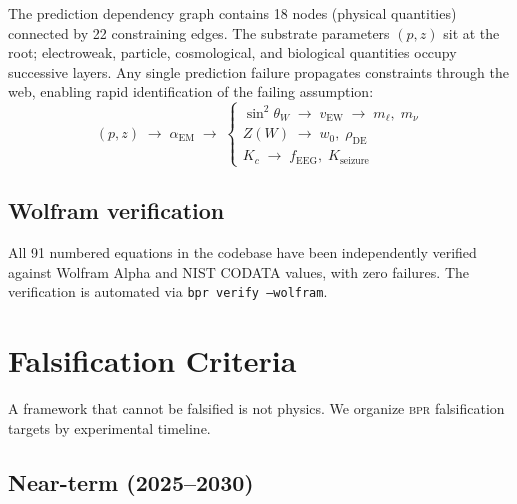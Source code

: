 \documentclass[aps,prd,twocolumn,superscriptaddress,longbibliography,nofootinbib]{revtex4-2}
\newcommand{\vEW}{v_{\mathrm{EW}}}
\newcommand{\sinW}{\sin^2\!\theta_W}
\newcommand{\alphaEM}{\alpha_{\mathrm{EM}}}
\newcommand{\Zimp}{Z}
\newcommand{\bpr}{\textsc{bpr}}
\begin{document}
The prediction dependency graph contains 18 nodes (physical
quantities) connected by 22 constraining edges.  The substrate
parameters $(p, z)$ sit at the root; electroweak, particle,
cosmological, and biological quantities occupy successive layers.
Any single prediction failure propagates constraints through the
web, enabling rapid identification of the failing assumption:
\begin{equation}
(p, z) \;\to\; \alphaEM \;\to\;
\begin{cases}
\sinW \;\to\; \vEW \;\to\; m_\ell,\; m_\nu \\
\Zimp(W) \;\to\; w_0,\; \rho_{\mathrm{DE}} \\
K_c \;\to\; f_{\mathrm{EEG}},\; K_{\mathrm{seizure}}
\end{cases}
\label{eq:dep_web}
\end{equation}

\subsection{Wolfram verification}

All 91 numbered equations in the codebase have been independently
verified against Wolfram Alpha and NIST CODATA values, with zero
failures.  The verification is automated via \texttt{bpr verify
--wolfram}.


\section{Falsification Criteria}
\label{sec:falsification}

A framework that cannot be falsified is not physics.  We organize
\bpr{} falsification targets by experimental timeline.

\subsection{Near-term (2025--2030)}
\end{document}
